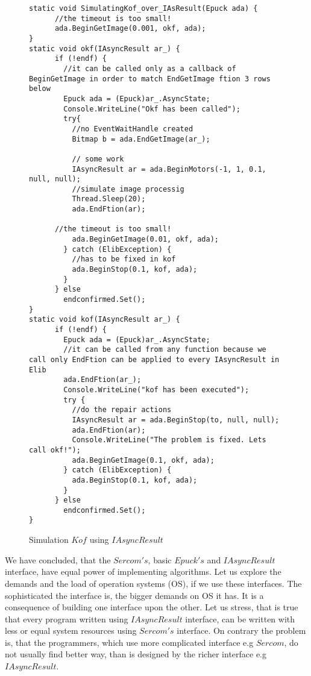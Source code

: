\begin{figure}[!hbp]

\begin{lstlisting}
static void SimulatingKof_over_IAsResult(Epuck ada) {
      //the timeout is too small!
      ada.BeginGetImage(0.001, okf, ada);
}
static void okf(IAsyncResult ar_) {
      if (!endf) {
        //it can be called only as a callback of BeginGetImage in order to match EndGetImage ftion 3 rows below
        Epuck ada = (Epuck)ar_.AsyncState;
        Console.WriteLine("Okf has been called");
        try{
          //no EventWaitHandle created
          Bitmap b = ada.EndGetImage(ar_);
          
          // some work
          IAsyncResult ar = ada.BeginMotors(-1, 1, 0.1, null, null);
          //simulate image processig
          Thread.Sleep(20);
          ada.EndFtion(ar);
	  
	  //the timeout is too small!
          ada.BeginGetImage(0.01, okf, ada);
        } catch (ElibException) {
          //has to be fixed in kof
          ada.BeginStop(0.1, kof, ada);
        }
      } else
        endconfirmed.Set();
}
static void kof(IAsyncResult ar_) {
      if (!endf) {
        Epuck ada = (Epuck)ar_.AsyncState;
        //it can be called from any function because we call only EndFtion can be applied to every IAsyncResult in Elib
        ada.EndFtion(ar_);
        Console.WriteLine("kof has been executed");
        try {
          //do the repair actions
          IAsyncResult ar = ada.BeginStop(to, null, null);
          ada.EndFtion(ar);
          Console.WriteLine("The problem is fixed. Lets call okf!");
          ada.BeginGetImage(0.1, okf, ada);
        } catch (ElibException) {
          ada.BeginStop(0.1, kof, ada);
        }
      } else
        endconfirmed.Set();
}
\end{lstlisting}
\caption{Simulation $Kof$ using $IAsyncResult$}
\label{iasynckof}
\end{figure}


	We have concluded, that the $Sercom's$, basic $Epuck's$ and $ IAsyncResult$ interface, have equal power of implementing algorithms.
	Let us explore the demands and the load of operation systems (OS), if we use these interfaces.
	The sophisticated the interface is, the bigger demands on OS it has. It is a consequence of building one interface upon the other.
	Let us stress, that is true that every program written using $IAsyncResult$ interface, can be written with less or equal system resources using $Sercom's$
	interface. On contrary the problem is, that the programmers, which  use more complicated interface e.g $Sercom$, do not usually find better way, 
	than is designed by the richer interface e.g $IAsyncResult$.

